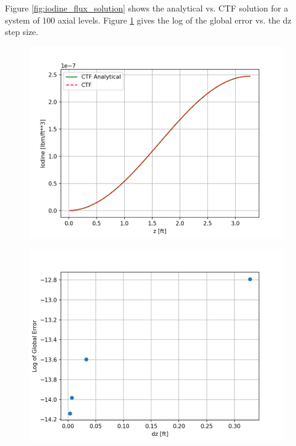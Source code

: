 Figure \ref{fig:iodine_flux_solution} shows the analytical vs. CTF solution for a system of 100 axial levels. Figure \ref{fig:iodine_flux_error} gives the log of the global error vs. the dz step size. 

\begin{figure}[ht] 
\centering
\begin{minipage}{.5\textwidth}
  \centering
  \includegraphics[width=.9\linewidth]{images/transportedSpeciesAxialNonuniform.png}
  \label{fig:iodine_flux_solution}
\end{minipage}%
\begin{minipage}{.5\textwidth}
  \centering
  \includegraphics[width=.9\linewidth]{images/transportedSpeciesAxialNonuniformError.png}
  \label{fig:iodine_flux_error}
\end{minipage}
\end{figure}

